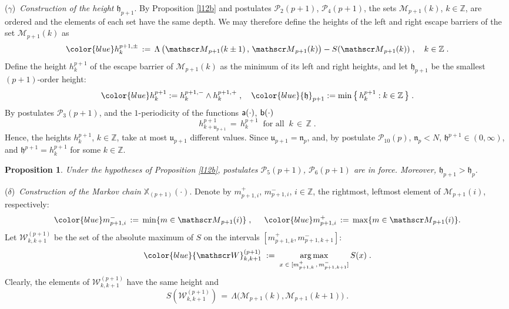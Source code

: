 \documentclass[reqno]{amsart}
\theoremstyle{plain}
\newtheorem{proposition}[theorem]{Proposition}
\theoremstyle{definition}
\newcommand{\mc}[1]{{\mathcal #1}}
\newcommand{\mf}[1]{{\mathfrak #1}}
\newcommand{\bb}[1]{{\mathbb #1}}
\newcommand{\ms}[1]{{\mathscr #1}}
\newcommand{\mss}[1]{{\textsf #1}}
\newcounter{as}[section]
\newcommand{\<}{\langle}
\renewcommand{\>}{\rangle}
\begin{document}
\medskip\noindent ($\gamma$){\it \ Construction of the \emph{height}
$\mf h_{p+1}$}.  By Proposition \ref{l12b} and postulates
$\mc P_2(p+1)$, $\mc P_4(p+1)$, the sets $\ms M_{p+1}(k)$,
$k\in\bb Z$, are ordered and the elements of each set have the same
depth. We may therefore define the heights of the left and right
escape barriers of the set $\ms M_{p+1}(k)$ as
\begin{equation}
\label{47b}
\begin{gathered}
{\color{blue} h^{p+1,\pm}_{k} }  \,:=\,
\Lambda\, \big (\ms M_{p+1}(k\pm 1) \,,\,
\ms M_{p+1}(k)\big)-S(\ms M_{p+1}(k))\;, \quad
k\in \bb Z \;.
\end{gathered}
\end{equation}
Define the height $h^{p+1}_{k}$ of the escape barrier of
$\ms M_{p+1}(k)$ as the minimum of its left and right heights, and let
$\mf h_{p+1}$ be the smallest $(p+1)$-order height:
\begin{equation}
\label{38b}
{\color{blue} h^{p+1}_{k}} := h^{p+1,-}_{k}\wedge h^{p+1,+}_{k} \;, \quad 
{\color{blue}\mf h_{p+1}} := \min
\big\{ \, h^{p+1}_{k} : k\in \bb Z\, \big\}\;.
\end{equation}
By postulates $\mc P_3(p+1)$, and the $1$-periodicity of the functions
$\mss a(\cdot)$, $\mss b(\cdot)$
\begin{equation}
\label{77}
h^{p+1}_{k+\mf u_{p+1}} \,=\, h^{p+1}_{k}\;\;\text{for all}\;\;
k\,\in\, \bb Z\;.
\end{equation}
Hence, the heights $h^{p+1}_{k}$, $k\in\bb Z$, take at most
$\mf u_{p+1}$ different values.  Since $\mf u_{p+1} = \mf n_p$, and,
by postulate $\mc P_{10}(p)$, $\mf n_p < N$,
$\mf h^{p+1} \in (0,\infty)$, and $\mf h^{p+1} = h^{p+1}_{k}$ for some
$k\in \bb Z$.

\begin{proposition}
\label{l11b}
Under the hypotheses of Proposition \ref{l12b}, postulates
$\mc P_5(p+1)$, $\mc P_6(p+1)$ are in force. Moreover,
$\mf h_{p+1}>\mf h_p$.
\end{proposition}


\medskip\noindent ($\delta$){\it \ Construction of the Markov chain
$\bb X_{(p+1)}(\cdot)$}.  Denote by $m^+_{p+1,i}$, $m^-_{p+1,i}$,
$i\in \bb Z$, the rightmost, leftmost element of $\ms M_{p+1}(i)$,
respectively:
\begin{equation}
\label{49b}
{\color{blue} m^-_{p+1,i}}
\,:=\,  \min\{m\in \ms M_{p+1}(i)\}\;, \hspace{5mm}
{\color{blue} m^+_{p+1,i}}
\,:=\,  \max\{m\in \ms M_{p+1}(i)\}.
\end{equation}
Let $\ms W^{(p+1)}_{k,k+1}$ be the set of the absolute maximum of
$S$ on the intervals $[m^+_{p+1, k}, m^-_{p+1, k+1}]$:
\begin{equation}\label{max_br}
{\color{blue}\ms W^{(p+1)}_{k,k+1} } \; := \;
\operatorname*{arg\,max}_{x\;\in\;
[m^+_{p+1, k} \,,\,  m^-_{p+1, k+1}]} S(x) \;.
\end{equation}
Clearly, the elements of $\ms W^{(p+1)}_{k,k+1}$ have the same
height and
\begin{equation*}
S(\ms W^{(p+1)}_{k,k+1}) \,=\,  \Lambda
\big(\ms M_{p+1}(k), \ms M_{p+1}(k+1)\big) \;.
\end{equation*}
\end{document}
